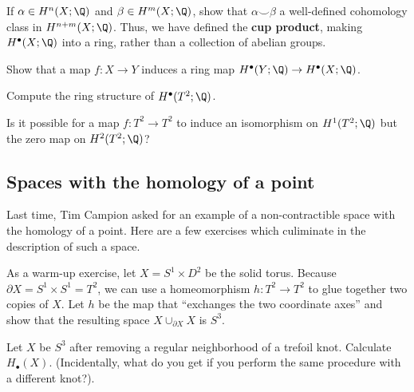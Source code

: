\documentclass[12pt]{pset}
\newcommand{\cupp}{\smallsmile}
\begin{document}
\begin{requiredproblem}
  If $\alpha \in H^n(X;\Q)$ and $\beta \in H^m(X;\Q)$, show that $\alpha
  \cupp \beta$ a well-defined cohomology class in $H^{n+m}(X;\Q)$.  Thus,
  we have defined the \textbf{cup product}, making $H^\bullet(X;\Q)$ into
  a ring, rather than a collection of abelian groups.
\end{requiredproblem}

\begin{problem}
  Show that a map $f : X \to Y$ induces a ring map $H^\bullet(Y;\Q) \to H^\bullet(X;\Q)$.
\end{problem}

\begin{problem}
  Compute the ring structure of $H^\bullet(T^2;\Q)$.
\end{problem}

\begin{problem}
  Is it possible for a map $f : T^2 \to T^2$ to induce an isomorphism
  on $H^1(T^2;\Q)$ but the zero map on $H^2(T^2;\Q)$?
\end{problem}


\subsection*{Spaces with the homology of a point}

Last time, Tim Campion asked for an example of a non-contractible
space with the homology of a point.  Here are a few exercises which
culiminate in the description of such a space.

\begin{problem}
  As a warm-up exercise, let $X = S^1 \times D^2$ be the solid torus.
  Because $\partial X = S^1 \times S^1 = T^2$, we can use a
  homeomorphism $h : T^2 \to T^2$ to glue together two copies of $X$.
  Let $h$ be the map that ``exchanges the two coordinate axes'' and
  show that the resulting space $X \cup_{\partial X} X$ is $S^3$.
\end{problem}

\begin{problem}
  Let $X$ be $S^3$ after removing a regular neighborhood of a trefoil
  knot.  Calculate $H_\bullet(X)$.  (Incidentally, what do you get if
  you perform the same procedure with a different knot?).
\end{problem}
\end{document}
